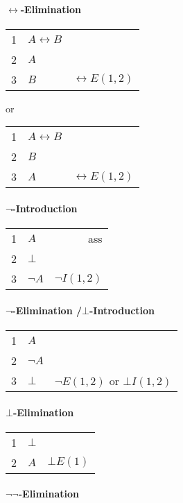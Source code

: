 \documentclass[10pt,twoside,twocolumn]{article}
\providecommand{\tabularnewline}{\\}
\begin{document}
\paragraph{$\boldsymbol{\leftrightarrow}$-Elimination}

\begin{tabular}{llr}
1 & $A\leftrightarrow B$ & \tabularnewline
2 & $A$ & \tabularnewline
3 & $B$ & $\leftrightarrow E\left(1,2\right)$\tabularnewline
\end{tabular} or %
\begin{tabular}{llr}
1 & $A\leftrightarrow B$ & \tabularnewline
2 & $B$ & \tabularnewline
3 & $A$ & $\leftrightarrow E\left(1,2\right)$\tabularnewline
\end{tabular}


\paragraph{$\boldsymbol{\lnot}$-Introduction}

\begin{tabular}{|llr|}
\hline 
1 & $A$ & ass\tabularnewline
2 & $\bot$ & \tabularnewline
\hline 
\multicolumn{1}{l}{3} & $\lnot A$ & \multicolumn{1}{r}{$\lnot I\left(1,2\right)$}\tabularnewline
\end{tabular}


\paragraph{$\boldsymbol{\lnot}$-Elimination /$\boldsymbol{\bot}$-Introduction}

\begin{tabular}{llr}
1 & $A$ & \tabularnewline
2 & $\lnot A$ & \tabularnewline
3 & $\bot$ & $\lnot E\left(1,2\right)$ or $\bot I\left(1,2\right)$\tabularnewline
\end{tabular}


\paragraph{$\boldsymbol{\bot}$-Elimination}

\begin{tabular}{llr}
1 & $\bot$ & \tabularnewline
2 & $A$ & $\bot E\left(1\right)$\tabularnewline
\end{tabular}


\paragraph{$\boldsymbol{\lnot\lnot}$-Elimination}
\end{document}

